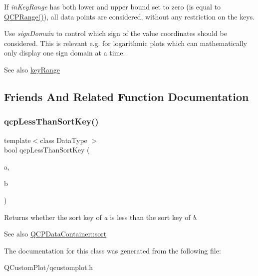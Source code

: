 If {\itshape in\+Key\+Range} has both lower and upper bound set to zero (is equal to {\ttfamily \mbox{\hyperlink{class_q_c_p_range}{Q\+C\+P\+Range()}}}), all data points are considered, without any restriction on the keys.

Use {\itshape sign\+Domain} to control which sign of the value coordinates should be considered. This is relevant e.\+g. for logarithmic plots which can mathematically only display one sign domain at a time.

\begin{DoxySeeAlso}{See also}
\mbox{\hyperlink{class_q_c_p_data_container_aba6e1a93c21ccc56a432b4a02c9d0ed2}{key\+Range}} 
\end{DoxySeeAlso}


\subsection{Friends And Related Function Documentation}
\mbox{\label{class_q_c_p_data_container_a74c5e06728cb6fa778a25d9ec0c4bd36}} 
\subsubsection{\texorpdfstring{qcp\+Less\+Than\+Sort\+Key()}{qcpLessThanSortKey()}}
{\footnotesize\ttfamily template$<$class Data\+Type $>$ \\
bool qcp\+Less\+Than\+Sort\+Key (\begin{DoxyParamCaption}\item[{const Data\+Type \&}]{a,  }\item[{const Data\+Type \&}]{b }\end{DoxyParamCaption})\hspace{0.3cm}{\ttfamily [related]}}

Returns whether the sort key of {\itshape a} is less than the sort key of {\itshape b}.

\begin{DoxySeeAlso}{See also}
\mbox{\hyperlink{class_q_c_p_data_container_a75da92e33063b63d6da5014683591d45}{Q\+C\+P\+Data\+Container\+::sort}} 
\end{DoxySeeAlso}


The documentation for this class was generated from the following file\+:\begin{DoxyCompactItemize}
\item 
Q\+Custom\+Plot/qcustomplot.\+h\end{DoxyCompactItemize}
